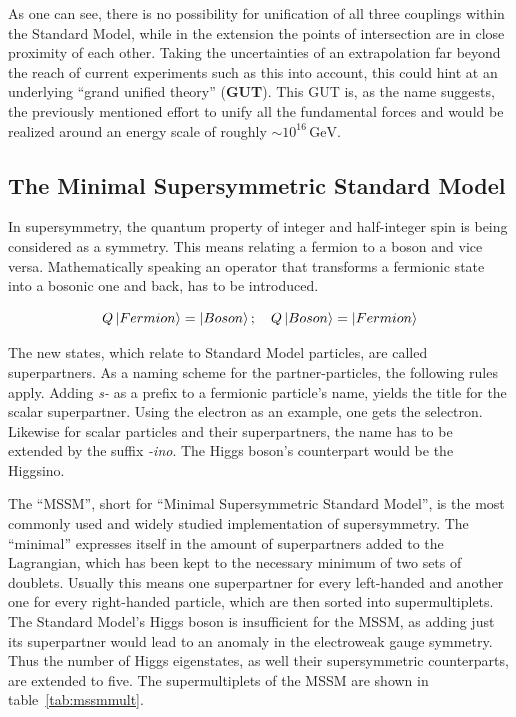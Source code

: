 As one can see, there is no possibility for unification of all three couplings within the Standard Model, while in the extension the points of intersection are in close proximity of each other. Taking the uncertainties of an extrapolation far beyond the reach of current experiments such as this into account, this could hint at an underlying ``grand unified theory'' (\textbf{GUT}). This GUT is, as the name suggests, the previously mentioned effort to unify all the fundamental forces and would be realized around an energy scale of roughly $\sim 10^{16}\,\text{GeV}$.



\subsection{The Minimal Supersymmetric Standard Model}

In supersymmetry, the quantum property of integer and half-integer spin is being considered as a symmetry. This means relating a fermion to a boson and vice versa. Mathematically speaking an operator that transforms a fermionic state into a bosonic one and back, has to be introduced.

\begin{equation}
  \label{eq:fermiboso}
  Q \Ket{Fermion} = \Ket{Boson}; \quad Q \Ket{Boson} = \Ket{Fermion}
\end{equation}

The new states, which relate to Standard Model particles, are called superpartners. As a naming scheme for the partner-particles, the following rules apply. Adding \textit{s-} as a prefix to a fermionic particle's name, yields the title for the scalar superpartner. Using the electron as an example, one gets the selectron. Likewise for scalar particles and their superpartners, the name has to be extended by the suffix \textit{-ino}. The Higgs boson's counterpart would be the Higgsino.

The ``MSSM'', short for ``Minimal Supersymmetric Standard Model'', is the most commonly used and widely studied implementation of supersymmetry. The ``minimal'' expresses itself in the amount of superpartners added to the Lagrangian, which has been kept to the necessary minimum of two sets of doublets. Usually this means one superpartner for every left-handed and another one for every right-handed particle, which are then sorted into supermultiplets. The Standard Model's Higgs boson is insufficient for the MSSM, as adding just its superpartner would lead to an anomaly in the electroweak gauge symmetry. Thus the number of Higgs eigenstates, as well their supersymmetric counterparts, are extended to five. The supermultiplets of the MSSM are shown in table~\ref{tab:mssmmult}.

